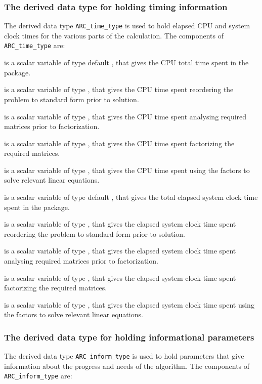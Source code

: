 \documentclass{galahad}
\newcommand{\packagename}{ARC}
\begin{document}
\subsubsection{The derived data type for holding timing
 information}\label{typetime}
The derived data type
{\tt \packagename\_time\_type}
is used to hold elapsed CPU and system clock times for the various parts
of the calculation. The components of
{\tt \packagename\_time\_type}
are:
\begin{description}
 is a scalar variable of type default \real, that gives
 the CPU total time spent in the package.

 is a scalar variable of type \realdp, that gives
 the CPU time spent reordering the problem to standard form prior to solution.

 is a scalar variable of type \realdp, that gives
 the CPU time spent analysing required matrices prior to factorization.

 is a scalar variable of type \realdp, that gives
 the CPU time spent factorizing the required matrices.

 is a scalar variable of type \realdp, that gives
 the CPU time spent using the factors to solve relevant linear equations.

 is a scalar variable of type default \real, that gives
 the total elapsed system clock time spent in the package.

 is a scalar variable of type \realdp, that gives
 the elapsed system clock time spent reordering the problem to standard form
prior to solution.

 is a scalar variable of type \realdp, that gives
 the  elapsed system clock time spent analysing required matrices prior to
factorization.

 is a scalar variable of type \realdp, that gives
 the  elapsed system clock time spent factorizing the required matrices.

 is a scalar variable of type \realdp, that gives
 the  elapsed system clock time spent using the factors to solve relevant
linear equations.

\end{description}


\subsubsection{The derived data type for holding informational
 parameters}\label{typeinform}
The derived data type
{\tt \packagename\_inform\_type}
is used to hold parameters that give information about the progress and needs
of the algorithm. The components of
{\tt \packagename\_inform\_type}
are:
\end{document}
